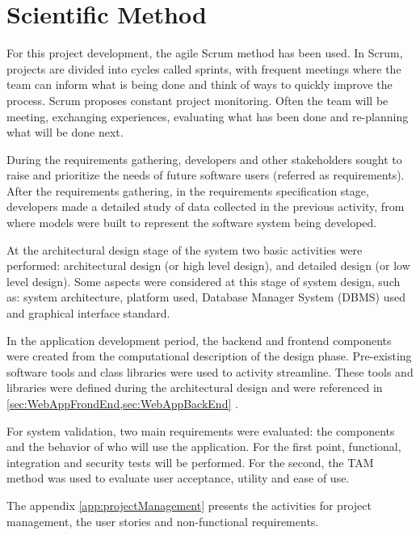 \label{chap:useExample}

\acresetall 

\section{Scientific Method}\label{sec:method}

For this project development, the agile Scrum method has been used. In Scrum, projects are divided into cycles called sprints, with frequent meetings where the team can inform what is being done and think of ways to quickly improve the process. Scrum proposes constant project monitoring. Often the team will be meeting, exchanging experiences, evaluating what has been done and re-planning what will be done next.

During the requirements gathering, developers and other stakeholders sought to raise and prioritize the needs of future software users (referred as requirements). After the requirements gathering, in the requirements specification stage, developers made a detailed study of data collected in the previous activity, from where models were built to represent the software system being developed.

At the architectural design stage of the system two basic activities were performed: architectural design (or high level design), and detailed design (or low level design). Some aspects were considered at this stage of system design, such as: system architecture, platform used, Database Manager System (DBMS) used and graphical interface standard.

In the application development period, the backend and frontend components were created from the computational description of the design phase. Pre-existing software tools and class libraries were used to activity streamline. These tools and libraries were defined during the architectural design and were referenced in \cref{sec:WebAppFrondEnd,sec:WebAppBackEnd} .

For system validation, two main requirements were evaluated: the components and the behavior of who will use the application. For the first point, functional, integration and security tests will be performed. For the second, the \acf{TAM} method was used to evaluate user acceptance, utility and ease of use.

The appendix \ref{app:projectManagement} presents the activities for project management, the user stories and non-functional requirements. 



